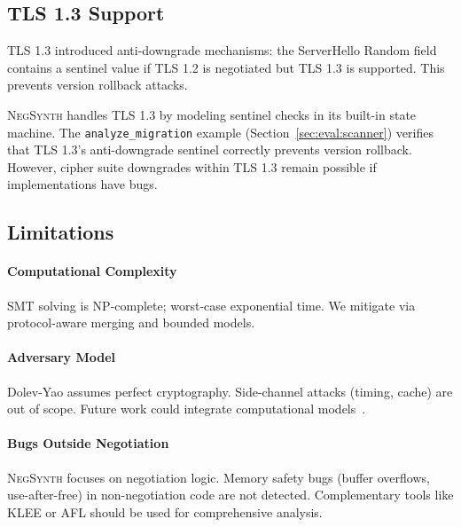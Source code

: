 \documentclass[10pt,twocolumn]{article}
\begin{document}
\subsection{TLS 1.3 Support}

TLS 1.3 introduced anti-downgrade mechanisms: the ServerHello Random field contains a sentinel value if TLS 1.2 is negotiated but TLS 1.3 is supported. This prevents version rollback attacks.

\textsc{NegSynth} handles TLS 1.3 by modeling sentinel checks in its built-in state machine.  The \texttt{analyze\_migration} example (Section~\ref{sec:eval:scanner}) verifies that TLS 1.3's anti-downgrade sentinel correctly prevents version rollback.  However, cipher suite downgrades within TLS 1.3 remain possible if implementations have bugs.

\subsection{Limitations}

\paragraph{Computational Complexity}
SMT solving is NP-complete; worst-case exponential time. We mitigate via protocol-aware merging and bounded models.

\paragraph{Adversary Model}
Dolev-Yao assumes perfect cryptography. Side-channel attacks (timing, cache) are out of scope. Future work could integrate computational models~\cite{blanchet2006cryptoverif}.

\paragraph{Bugs Outside Negotiation}
\textsc{NegSynth} focuses on negotiation logic. Memory safety bugs (buffer overflows, use-after-free) in non-negotiation code are not detected. Complementary tools like KLEE or AFL should be used for comprehensive analysis.
\end{document}
